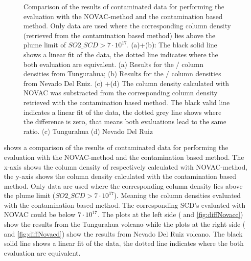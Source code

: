 \documentclass  [
  paper    = a4,
  BCOR     = 10mm,
  twoside,
  fontsize = 12pt,
  fleqn,
  toc      = bibnumbered,
  toc      = listofnumbered,
  numbers  = noendperiod,
  headings = normal,
  listof   = leveldown,
  version  = 3.03
]                                       {scrreprt}
\begin{document}
\begin{figure}[h!]
{		\label{fig:diffratioc}}
	\caption{Comparison of the results of contaminated data for performing the evaluation with the NOVAC-method and the contamination based method. Only data are used where the corresponding   column density (retrieved from the contamination based method) lies above the plume limit of $SO2\_SCD>7\cdot 10^{17}$. (a)+(b): The black solid line shows a linear fit of the data, the dotted line indicates where the both evaluation are equivalent. (a) Results for the   /  column densities from Tungurahua; (b) Results for the   /  column densities from Nevado Del Ruiz. 
		(c) +(d) The column density calculated with NOVAC was substracted from the corresponding column density retrieved with the contamination based method. The black valid line indicates a linear fit of the data, the dotted grey line shows where the difference is zero, that means both evaluations lead to the same ratio. (c) Tungurahua (d) Nevado Del Ruiz}
	\label{fig:diffratio}
\end{figure}
	 shows a comparison of the results of contaminated data for performing the evaluation with the NOVAC-method and the contamination based method. The x-axis shows the column density of   respectively   calculated with NOVAC-method, the y-axis shows the column density calculated with the contamination based method. Only data are used where the corresponding   column density lies above the plume limit ($SO2\_SCD>7\cdot 10^{17}$). Meaning the column densities evaluated with the contamination based method. The corresponding   SCD's evaluated with NOVAC could be below $7\cdot 10^{17}$.
	The plots at the left side ( and \ref{fig:diffNovacc}) show the results from the Tungurahua volcano while the plots at the right side ( and \ref{fig:diffNovacd}) show the results from Nevado Del Ruiz volcano. The black solid line shows a linear fit of the data, the dotted line indicates where the both evaluation are equivalent.\\
\end{document}
